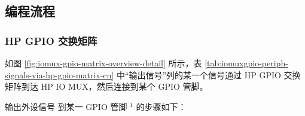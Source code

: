 \documentclass[main\_\_CN.tex]{subfiles}
\begin{document}
\subsection{编程流程}\label{IOMUXPeripheralOutput}

\subsubsection{HP GPIO 交换矩阵}
\label{sec:prgramming-procedure-for-hp-output}
如图 \ref{fig:iomux-gpio-matrix-overview-detail} 所示，表 \ref{tab:iomuxgpio-periph-signals-via-hp-gpio-matrix-cn} 中“输出信号”列的某一个信号通过 HP GPIO 交换矩阵到达 HP IO MUX，然后连接到某个 GPIO 管脚。

输出外设信号  到某一 GPIO 管脚 \hyperref[output-note-1]{$^1$} 的步骤如下：
\end{document}
